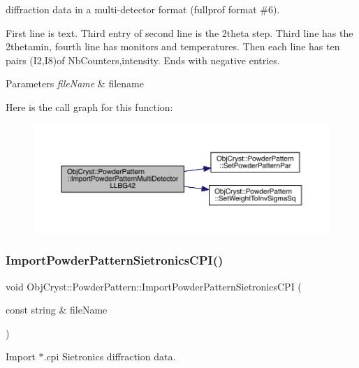 diffraction data in a multi-\/detector format (fullprof format \#6). 

First line is text. Third entry of second line is the 2theta step. Third line has the 2thetamin, fourth line has monitors and temperatures. Then each line has ten pairs (I2,I8)of Nb\+Counters,intensity. Ends with negative entries. 
\begin{DoxyParams}{Parameters}
{\em file\+Name} & filename \\
\hline
\end{DoxyParams}
Here is the call graph for this function\+:
\nopagebreak
\begin{figure}[H]
\begin{center}
\leavevmode
\includegraphics[width=350pt]{class_obj_cryst_1_1_powder_pattern_abfc7890a1853583957284fc1a2644855_cgraph}
\end{center}
\end{figure}
\mbox{\label{class_obj_cryst_1_1_powder_pattern_adabe6381d8d1189abcf420f69a41cc81}} 
\subsubsection{\texorpdfstring{ImportPowderPatternSietronicsCPI()}{ImportPowderPatternSietronicsCPI()}}
{\footnotesize\ttfamily void Obj\+Cryst\+::\+Powder\+Pattern\+::\+Import\+Powder\+Pattern\+Sietronics\+C\+PI (\begin{DoxyParamCaption}\item[{const string \&}]{file\+Name }\end{DoxyParamCaption})}



Import $\ast$.cpi Sietronics diffraction data. 


